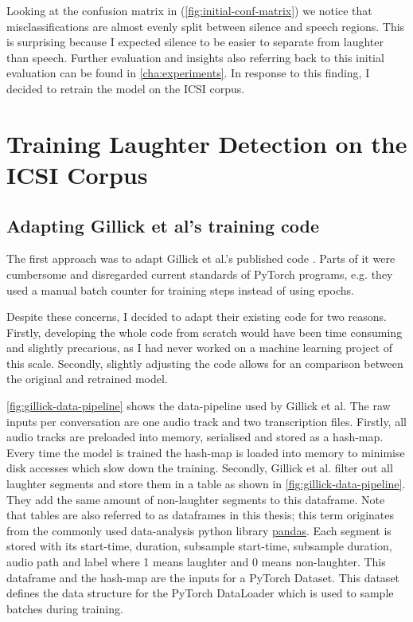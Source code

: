 \documentclass[bsc,frontabs,parskip,deptreport]{infthesis}
\begin{document}
Looking at the confusion matrix in (\autoref{fig:initial-conf-matrix}) we notice that misclassifications are almost evenly split between silence and speech regions. This is surprising because I expected silence to be easier to separate from laughter than speech.
Further evaluation and insights also referring back to this initial evaluation can be found in \autoref{cha:experiments}.
In response to this finding, I decided to retrain the model on the ICSI corpus. 


\chapter{Training Laughter Detection on the ICSI Corpus} \label{cha:retraining}
\section{Adapting Gillick et al's training code} 
The first approach was to adapt Gillick et al.'s published code \citep{gillick-codebase}. 
Parts of it were cumbersome and disregarded current standards of PyTorch programs, e.g. they used a manual batch counter for training steps instead of using epochs.  

Despite these concerns, I decided to adapt their existing code for two reasons.
Firstly, developing the whole code from scratch would have been time consuming and slightly precarious, as I had never worked on a machine learning project of this scale.
Secondly, slightly adjusting the code allows for an comparison between the original and retrained model. 

\autoref{fig:gillick-data-pipeline} shows the data-pipeline used by Gillick et al. The raw inputs per conversation are one audio track and two transcription files. 
Firstly, all audio tracks are preloaded into memory, serialised and stored as a hash-map. Every time the model is trained the hash-map is loaded into memory to minimise disk accesses which slow down the training. 
Secondly, Gillick et al. filter out all laughter segments and store them in a table as shown in \autoref{fig:gillick-data-pipeline}.
They add the same amount of non-laughter segments to this dataframe. 
Note that tables are also referred to as dataframes in this thesis; this term originates from the commonly used data-analysis python library \href{https://pandas.pydata.org/}{pandas}.
Each segment is stored with its start-time, duration, subsample start-time, subsample duration, audio path and label where 1 means laughter and 0 means non-laughter. 
This dataframe and the hash-map are the inputs for a PyTorch Dataset. This dataset defines the data structure for the PyTorch DataLoader which is used to sample batches during training.
\end{document}
